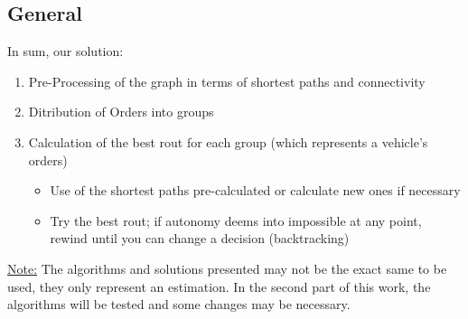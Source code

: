 \subsection{General}
In sum, our solution:
\begin{enumerate}
    \item Pre-Processing of the graph in terms of shortest paths and connectivity
    \item Ditribution of Orders into groups
    \item Calculation of the best rout for each group (which represents a vehicle's orders)
    \begin{itemize}
        \item Use of the shortest paths pre-calculated or calculate new ones if necessary
        \item Try the best rout; if autonomy deems into impossible at any point, rewind until you can change a decision (backtracking)
    \end{itemize}
\end{enumerate}
\uline{Note:} The algorithms and solutions presented may not be the exact same to be used, they only represent an estimation. In the second part of this work, the algorithms will be tested and some changes may be necessary.
